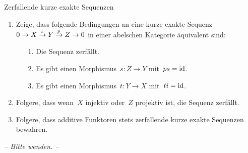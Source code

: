 \documentclass{uebblatt}
\begin{document}
\begin{aufgabe}{Zerfallende kurze exakte Sequenzen}
\begin{enumerate}
\item
Zeige, dass folgende Bedingungen an eine kurze exakte Sequenz~$0 \to X \xrightarrow{i} Y
\xrightarrow{p} Z \to 0$ in einer abelschen Kategorie äquivalent sind:
\begin{enumerate}
\item[1.] Die Sequenz zerfällt.
\item[2.] Es gibt einen Morphismus~$s : Z \to Y$ mit~$ps = \mathrm{id}$.
\item[3.] Es gibt einen Morphismus~$t : Y \to X$ mit~$ti = \mathrm{id}$.
\end{enumerate}
\item Folgere, dass wenn~$X$ injektiv oder~$Z$ projektiv ist, die Sequenz
zerfällt.
\item Folgere, dass additive Funktoren stets zerfallende kurze exakte Sequenzen
bewahren.
\end{enumerate}
\end{aufgabe}

\begin{center}\emph{-- Bitte wenden. --}\end{center}
\end{document}
